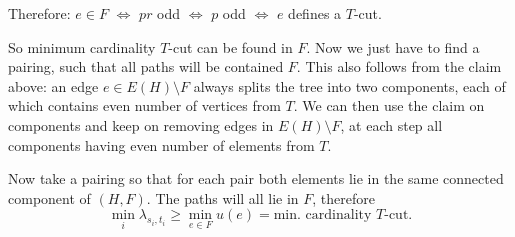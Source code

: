 \begin{exercise}{2}
\begin{proof_claim}
        Therefore: $e \in F$ $\Leftrightarrow$ $pr$ odd $\Leftrightarrow$ $p$
        odd $\Leftrightarrow$ $e$ defines a $T$-cut.
    \end{proof_claim}

    So minimum cardinality $T$-cut can be found in $F$. Now we just have to find
    a pairing, such that all paths will be contained $F$. This also follows from
    the claim above: an edge $e \in E(H) \setminus F$ always splits the tree
    into two components, each of which contains even number of vertices from
    $T$. We can then use the claim on components and keep on removing edges in
    $E(H) \setminus F$, at each step all components having even number of
    elements from $T$.

    Now take a pairing so that for each pair both elements lie in the same
    connected component of $(H, F)$. The paths will all lie in $F$, therefore
    \begin{equation*}
        \min_i \lambda_{s_i, t_i} \geq \min_{e \in F} u(e) = \text{min.
        cardinality $T$-cut}.
    \end{equation*}
\end{exercise}


